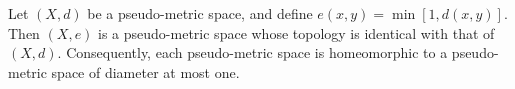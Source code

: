 Let $(X,d)$ be a pseudo-metric space, and define $e(x,y) = \min[1, d(x,y)]$. Then $(X,e)$ is a pseudo-metric space whose topology is identical with that of $(X,d)$. Consequently, each pseudo-metric space is homeomorphic to a pseudo-metric space of diameter at most one.
